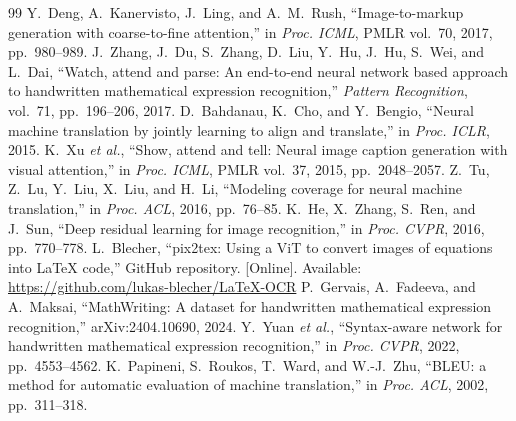 \documentclass[conference]{IEEEtran}
\begin{document}
\begin{thebibliography}{99}
 Y.~Deng, A.~Kanervisto, J.~Ling, and A.~M.~Rush, ``Image-to-markup generation with coarse-to-fine attention,'' in \emph{Proc. ICML}, PMLR vol.~70, 2017, pp.~980--989.
 J.~Zhang, J.~Du, S.~Zhang, D.~Liu, Y.~Hu, J.~Hu, S.~Wei, and L.~Dai, ``Watch, attend and parse: An end-to-end neural network based approach to handwritten mathematical expression recognition,'' \emph{Pattern Recognition}, vol.~71, pp.~196--206, 2017.
 D.~Bahdanau, K.~Cho, and Y.~Bengio, ``Neural machine translation by jointly learning to align and translate,'' in \emph{Proc. ICLR}, 2015.
 K.~Xu \emph{et al.}, ``Show, attend and tell: Neural image caption generation with visual attention,'' in \emph{Proc. ICML}, PMLR vol.~37, 2015, pp.~2048--2057.
 Z.~Tu, Z.~Lu, Y.~Liu, X.~Liu, and H.~Li, ``Modeling coverage for neural machine translation,'' in \emph{Proc. ACL}, 2016, pp.~76--85.
 K.~He, X.~Zhang, S.~Ren, and J.~Sun, ``Deep residual learning for image recognition,'' in \emph{Proc. CVPR}, 2016, pp.~770--778.
 L.~Blecher, ``pix2tex: Using a ViT to convert images of equations into LaTeX code,'' GitHub repository. [Online]. Available: \url{https://github.com/lukas-blecher/LaTeX-OCR}
 P.~Gervais, A.~Fadeeva, and A.~Maksai, ``MathWriting: A dataset for handwritten mathematical expression recognition,'' arXiv:2404.10690, 2024.
 Y.~Yuan \emph{et al.}, ``Syntax-aware network for handwritten mathematical expression recognition,'' in \emph{Proc. CVPR}, 2022, pp.~4553--4562.
 K.~Papineni, S.~Roukos, T.~Ward, and W.-J.~Zhu, ``BLEU: a method for automatic evaluation of machine translation,'' in \emph{Proc. ACL}, 2002, pp.~311--318.
\end{thebibliography}
\end{document}
